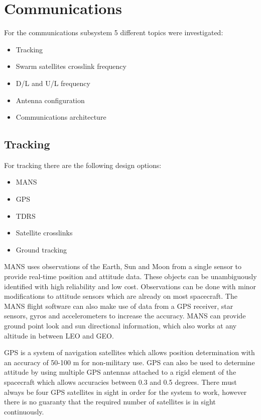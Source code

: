 \section{Communications}
\label{designOptionsCommunications}

For the communications subsystem 5 different topics were investigated:
\begin{itemize}
\item Tracking
\item Swarm satellites crosslink frequency
\item D/L and U/L frequency
\item Antenna configuration
\item Communications architecture
\end{itemize}

\subsection{Tracking}
For tracking there are the following design options:
\begin {itemize}
\item \ac{MANS}
\item \acs{GPS}
\item \ac{TDRS}
\item Satellite crosslinks
\item Ground tracking
\end {itemize}

\acs{MANS} uses observations of the Earth, Sun and Moon from a single sensor to provide real-time position and attitude data. These objects can be unambiguously identified with high reliability and low cost. Observations can be done with minor modifications to attitude sensors which are already on most spacecraft. The MANS flight software can also make use of data from a GPS receiver, star sensors, gyros and accelerometers to increase the accuracy. MANS can provide ground point look and sun directional information, which also works at any altitude in between \acs{LEO} and \acs{GEO}.

\acs{GPS} is a system of navigation satellites which allows position determination with an accuracy of 50-100 m for non-military use. GPS can also be used to determine attitude by using multiple GPS antennas attached to a rigid element of the spacecraft which allows accuracies between 0.3 and 0.5 degrees. There must always be four GPS satellites in sight in order for the system to work, however there is no guaranty that the required number of satellites is in sight continuously.

